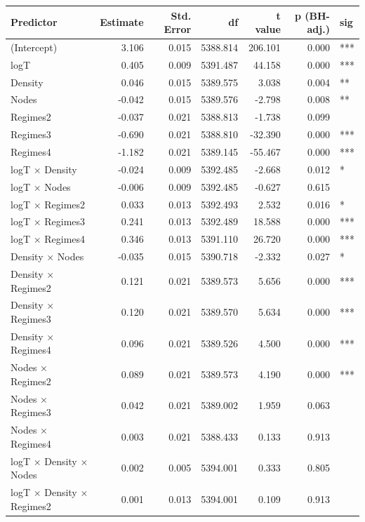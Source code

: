 \begin{table}[ht]
\centering
\begin{tabular}{lrrrrrl}
  \hline
Predictor & Estimate & Std. Error & df & t value & p (BH-adj.) & sig \\ 
  \hline
(Intercept) & 3.106 & 0.015 & 5388.814 & 206.101 & 0.000 & *** \\ 
  logT & 0.405 & 0.009 & 5391.487 & 44.158 & 0.000 & *** \\ 
  Density & 0.046 & 0.015 & 5389.575 & 3.038 & 0.004 & ** \\ 
  Nodes & -0.042 & 0.015 & 5389.576 & -2.798 & 0.008 & ** \\ 
  Regimes2 & -0.037 & 0.021 & 5388.813 & -1.738 & 0.099 &  \\ 
  Regimes3 & -0.690 & 0.021 & 5388.810 & -32.390 & 0.000 & *** \\ 
  Regimes4 & -1.182 & 0.021 & 5389.145 & -55.467 & 0.000 & *** \\ 
  logT × Density & -0.024 & 0.009 & 5392.485 & -2.668 & 0.012 & * \\ 
  logT × Nodes & -0.006 & 0.009 & 5392.485 & -0.627 & 0.615 &  \\ 
  logT × Regimes2 & 0.033 & 0.013 & 5392.493 & 2.532 & 0.016 & * \\ 
  logT × Regimes3 & 0.241 & 0.013 & 5392.489 & 18.588 & 0.000 & *** \\ 
  logT × Regimes4 & 0.346 & 0.013 & 5391.110 & 26.720 & 0.000 & *** \\ 
  Density × Nodes & -0.035 & 0.015 & 5390.718 & -2.332 & 0.027 & * \\ 
  Density × Regimes2 & 0.121 & 0.021 & 5389.573 & 5.656 & 0.000 & *** \\ 
  Density × Regimes3 & 0.120 & 0.021 & 5389.570 & 5.634 & 0.000 & *** \\ 
  Density × Regimes4 & 0.096 & 0.021 & 5389.526 & 4.500 & 0.000 & *** \\ 
  Nodes × Regimes2 & 0.089 & 0.021 & 5389.573 & 4.190 & 0.000 & *** \\ 
  Nodes × Regimes3 & 0.042 & 0.021 & 5389.002 & 1.959 & 0.063 &  \\ 
  Nodes × Regimes4 & 0.003 & 0.021 & 5388.433 & 0.133 & 0.913 &  \\ 
  logT × Density × Nodes & 0.002 & 0.005 & 5394.001 & 0.333 & 0.805 &  \\ 
  logT × Density × Regimes2 & 0.001 & 0.013 & 5394.001 & 0.109 & 0.913 &  \\ 

\end{tabular}
\end{table}
